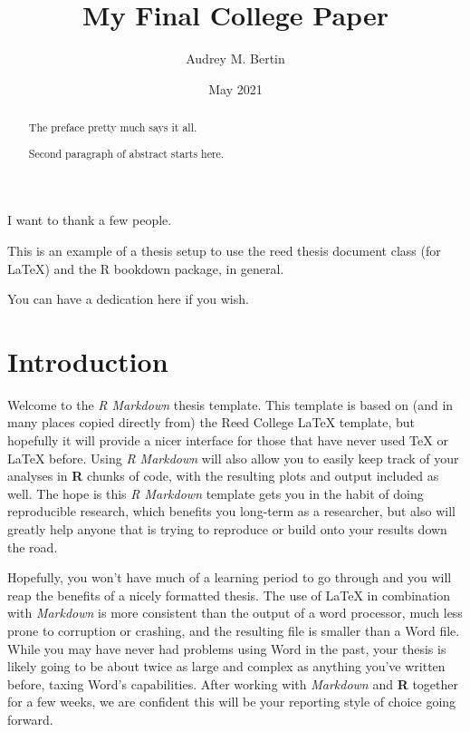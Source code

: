 \documentclass[12pt,twoside]{reedthesis}
\title{My Final College Paper}
\author{Audrey M. Bertin}
\date{May 2021}
\begin{document}
  \maketitle

\frontmatter %
\pagestyle{empty} %
  \begin{acknowledgements}
    I want to thank a few people.
  \end{acknowledgements}
  \begin{preface}
    This is an example of a thesis setup to use the reed thesis document
    class (for LaTeX) and the R bookdown package, in general.
  \end{preface}
  \hypersetup{linkcolor=black}
  \setcounter{tocdepth}{2}
  \tableofcontents


  \begin{abstract}
    The preface pretty much says it all. \par
    Second paragraph of abstract starts here.
  \end{abstract}
  \begin{dedication}
    You can have a dedication here if you wish.
  \end{dedication}
\mainmatter %
\pagestyle{fancyplain} %

\chapter*{Introduction}\label{introduction}

Welcome to the \emph{R Markdown} thesis template. This template is based
on (and in many places copied directly from) the Reed College LaTeX
template, but hopefully it will provide a nicer interface for those that
have never used TeX or LaTeX before. Using \emph{R Markdown} will also
allow you to easily keep track of your analyses in \textbf{R} chunks of
code, with the resulting plots and output included as well. The hope is
this \emph{R Markdown} template gets you in the habit of doing
reproducible research, which benefits you long-term as a researcher, but
also will greatly help anyone that is trying to reproduce or build onto
your results down the road.

Hopefully, you won't have much of a learning period to go through and
you will reap the benefits of a nicely formatted thesis. The use of
LaTeX in combination with \emph{Markdown} is more consistent than the
output of a word processor, much less prone to corruption or crashing,
and the resulting file is smaller than a Word file. While you may have
never had problems using Word in the past, your thesis is likely going
to be about twice as large and complex as anything you've written
before, taxing Word's capabilities. After working with \emph{Markdown}
and \textbf{R} together for a few weeks, we are confident this will be
your reporting style of choice going forward.
\end{document}
